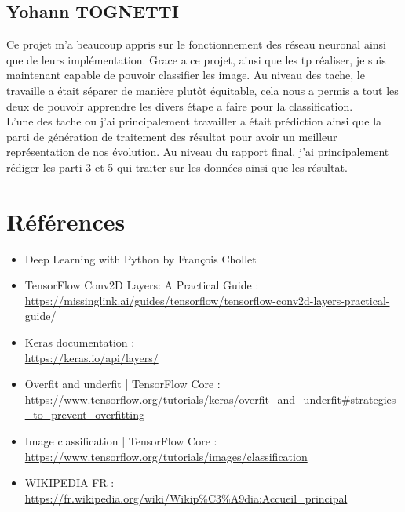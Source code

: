 \documentclass[12pt ,a4paper ]{article}
\begin{document}
\subsection{Yohann TOGNETTI}
Ce projet m'a beaucoup appris sur le fonctionnement des réseau neuronal ainsi que de leurs implémentation. Grace a ce projet, ainsi que les tp réaliser, je suis maintenant capable de pouvoir classifier les image. Au niveau des tache, le travaille a était séparer de manière plutôt équitable, cela nous a permis a tout les deux de pouvoir apprendre les divers étape a faire pour la classification.\\
L'une des tache ou j'ai principalement travailler a était prédiction ainsi que la parti de génération de traitement des résultat pour avoir un meilleur représentation de nos évolution. 
Au niveau du rapport final, j'ai principalement rédiger les parti 3 et 5 qui traiter sur les données ainsi que les résultat.
\newpage
\section{Références}
\begin{itemize}
\item Deep Learning with Python by François Chollet 
\item TensorFlow Conv2D Layers: A Practical Guide :\\ \url{https://missinglink.ai/guides/tensorflow/tensorflow-conv2d-layers-practical-guide/}%
\item Keras documentation :\\ \url{https://keras.io/api/layers/}%
\item Overfit and underfit  |  TensorFlow Core :\\ \url{https://www.tensorflow.org/tutorials/keras/overfit_and_underfit#strategies_to_prevent_overfitting}%
\item Image classification  |  TensorFlow Core :\\ \url{https://www.tensorflow.org/tutorials/images/classification}%
\item WIKIPEDIA FR :\\ \url{https://fr.wikipedia.org/wiki/Wikip%C3%A9dia:Accueil_principal}%
\end{itemize}
\end{document}
